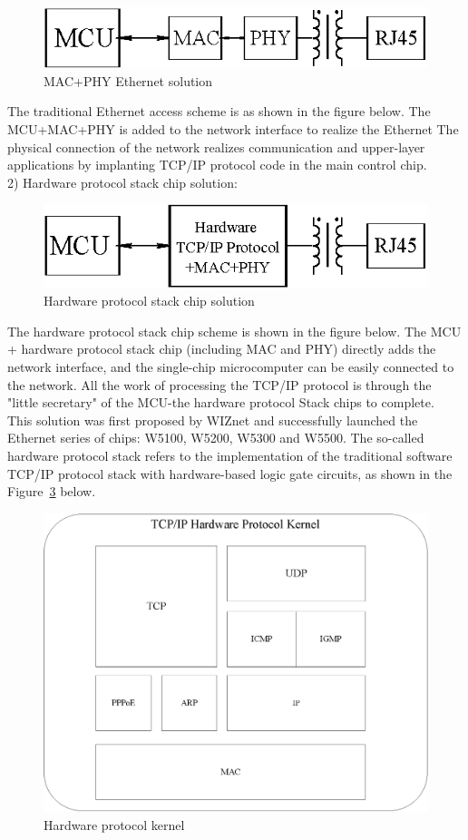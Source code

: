 \begin{figure}[!ht]
	\centering
	\includegraphics {grafiken/2.7.eps}
	\caption{MAC+PHY Ethernet solution} 
	\label{fig:2.7}
\end{figure}
\FloatBarrier
The traditional Ethernet access scheme is as shown in the figure below. The MCU+MAC+PHY is added to the network interface to realize the Ethernet
The physical connection of the network realizes communication and upper-layer applications by implanting TCP/IP protocol code in the main control chip.
\\
2) Hardware protocol stack chip solution: 
\begin{figure}[!ht]
	\centering
	\includegraphics {grafiken/2.8.eps}
	\caption{Hardware protocol stack chip solution} 
	\label{fig:2.8}
\end{figure}
\FloatBarrier
The hardware protocol stack chip scheme is shown in the figure below. The MCU + hardware protocol stack chip (including MAC and PHY) directly adds the network interface, and the single-chip microcomputer can be easily connected to the network. All the work of processing the TCP/IP protocol is through the "little secretary" of the MCU-the hardware protocol Stack chips to complete.
\\
This solution was first proposed by WIZnet and successfully launched the Ethernet series of chips: W5100, W5200, W5300 and W5500. The so-called hardware protocol stack refers to the implementation of the traditional software TCP/IP protocol stack with hardware-based logic gate circuits, as shown in the Figure~\ref{fig:2.9} below.
\begin{figure}[!ht]
	\centering
	\includegraphics[scale=0.85]{grafiken/2.9.eps}
	\caption{Hardware protocol kernel} 
	\label{fig:2.9}
\end{figure}
